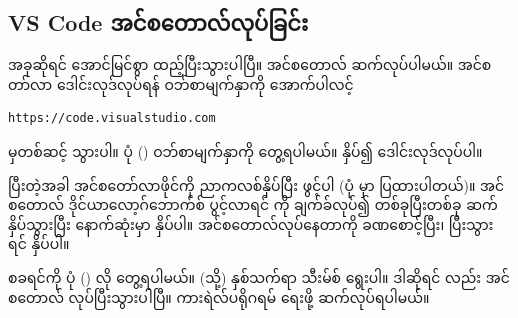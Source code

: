 \begin{figure}[tbh!]
\caption{} 
\label{fig:pycmdchk}
\end{figure}

\clearpage
\subsection*{VS Code အင်စတောလ်လုပ်ခြင်း}
အခုဆိုရင်  အောင်မြင်စွာ ထည့်ပြီးသွားပါပြီ။  အင်စတောလ် ဆက်လုပ်ပါမယ်။ အင်စတာ်လာ ဒေါင်းလုဒ်လုပ်ရန် ဝဘ်စာမျက်နှာကို အောက်ပါလင့်
%
\begin{verbatim}
https://code.visualstudio.com 
\end{verbatim}
%
မှတစ်ဆင့် သွားပါ။ ပုံ (\fRefNo{\ref{fig:vsdwnpg}}) ဝဘ်စာမျက်နှာကို တွေ့ရပါမယ်။  နှိပ်၍ ဒေါင်းလုဒ်လုပ်ပါ။

ပြီးတဲ့အခါ အင်စတော်လာဖိုင်ကို ညာကလစ်နှိပ်ပြီး ဖွင့်ပါ (ပုံ \fRefNo{\ref{fig:vsinstlropn}} မှာ ပြထားပါတယ်)။ အင်စတောလ် ဒိုင်ယာလော့ဂ်ဘောက်စ် ပွင့်လာရင်  ကို ချက်ခ်လုပ်၍  တစ်ခုပြီးတစ်ခု ဆက်နှိပ်သွားပြီး နောက်ဆုံးမှာ   နှိပ်ပါ။ အင်စတောလ်လုပ်နေတာကို ခဏစောင့်ပြီး၊ ပြီးသွားရင်  နှိပ်ပါ။  

 စခရင်ကို ပုံ (\fRefNo{\ref{fig:vswlcm}}) လို တွေ့ရပါမယ်။  (သို့)  နှစ်သက်ရာ သီးမ်စ် ရွေးပါ။ ဒါဆိုရင်  လည်း အင်စတောလ် လုပ်ပြီးသွားပါပြီ။ ကားရဲလ်ပရိုဂရမ် ရေးဖို့ ဆက်လုပ်ရပါမယ်။

